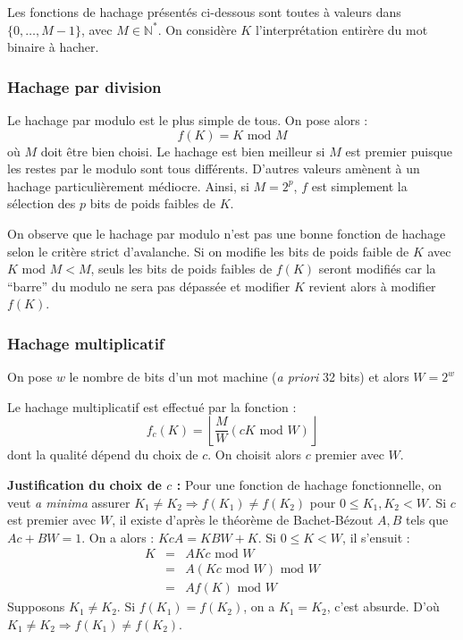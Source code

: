 \documentclass[../../../main.tex]{subfiles}
\begin{document}
Les fonctions de hachage présentés ci-dessous sont toutes à valeurs dans $\{0, \dots, M-1\}$, avec $M\in{\mathbb{N}^*}$. On considère $K$ l'interprétation entirère du mot binaire à hacher.
\subsubsection{Hachage par division}
Le hachage par modulo est le plus simple de tous.  On pose alors :
$$f(K) = K\text{ mod } M$$
où $M$ doit être bien choisi. Le hachage est bien meilleur si $M$ est premier puisque les restes par le modulo sont tous différents. D'autres valeurs amènent à un hachage particulièrement médiocre. Ainsi, si $M = 2^p$, $f$ est simplement la sélection des $p$ bits de poids faibles de $K$.

On observe que le hachage par modulo n'est pas une bonne fonction de hachage selon le critère strict d'avalanche. Si on modifie les bits de poids faible de $K$ avec $K\text{ mod }M < M$, seuls les bits de poids faibles de $f(K)$ seront modifiés car la ``barre'' du modulo ne sera pas dépassée et modifier $K$ revient alors à modifier $f(K)$.
\subsubsection{Hachage multiplicatif}
On pose $w$ le nombre de bits d'un mot machine (\textit{a priori} 32 bits) et alors $W = 2^w$

Le hachage multiplicatif est effectué par la fonction :
$$f_c(K) = \left\lfloor\dfrac{M}{W}(c K\text{ mod }W)\right\rfloor$$
dont la qualité dépend du choix de $c$. On choisit alors $c$ premier avec $W$.

\textbf{Justification du choix de $c$ :} Pour une fonction de hachage fonctionnelle, on veut \textit{a minima} assurer $K_1\neq K_2\Rightarrow f(K_1)\neq f(K_2)$ pour $0 \leq K_1, K_2 < W$. Si $c$ est premier avec $W$, il existe d'après le théorème de Bachet-Bézout $A, B$ tels que $Ac + BW = 1$. On a alors : $Kc A = KBW + K$.\newline
Si $0\leq K < W$, il s'ensuit :
$$\begin{array}{lcll}
K & = & AKc \text{ mod }W \\
  & = & A(Kc\text{ mod }W)\text{ mod }W \\
  & = & Af(K)\text{ mod } W\end{array}$$
Supposons $K_1\neq K_2$. Si $f(K_1) = f(K_2)$, on a $K_1 = K_2$, c'est absurde.\newline
D'où $K_1 \neq K_2 \Rightarrow f(K_1)\neq f(K_2)$.
\end{document}
